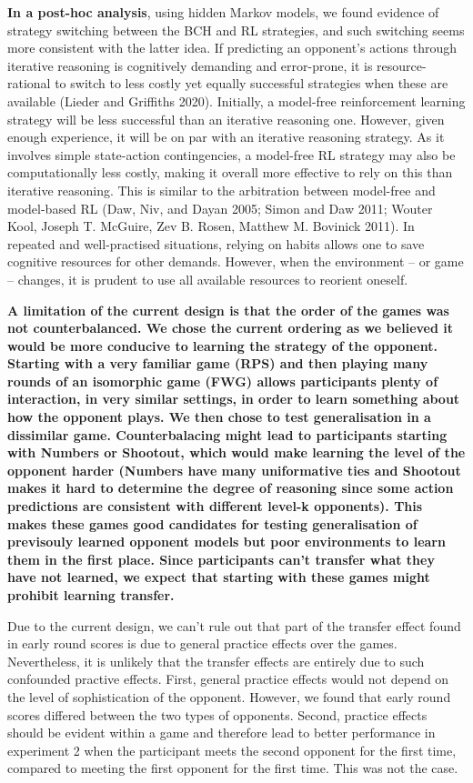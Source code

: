 \documentclass[smallextended]{svjour3}       %
\begin{document}
\textbf{In a post-hoc analysis}, using hidden Markov models, we found
evidence of strategy switching between the BCH and RL strategies, and
such switching seems more consistent with the latter idea. If predicting
an opponent's actions through iterative reasoning is cognitively
demanding and error-prone, it is resource-rational to switch to less
costly yet equally successful strategies when these are available
(Lieder and Griffiths 2020). Initially, a model-free reinforcement
learning strategy will be less successful than an iterative reasoning
one. However, given enough experience, it will be on par with an
iterative reasoning strategy. As it involves simple state-action
contingencies, a model-free RL strategy may also be computationally less
costly, making it overall more effective to rely on this than iterative
reasoning. This is similar to the arbitration between model-free and
model-based RL (Daw, Niv, and Dayan 2005; Simon and Daw 2011; Wouter
Kool, Joseph T. McGuire, Zev B. Rosen, Matthew M. Bovinick 2011). In
repeated and well-practised situations, relying on habits allows one to
save cognitive resources for other demands. However, when the
environment -- or game -- changes, it is prudent to use all available
resources to reorient oneself.

\textbf{A limitation of the current design is that the order of the
games was not counterbalanced. We chose the current ordering as we
believed it would be more conducive to learning the strategy of the
opponent. Starting with a very familiar game (RPS) and then playing many
rounds of an isomorphic game (FWG) allows participants plenty of
interaction, in very similar settings, in order to learn something about
how the opponent plays. We then chose to test generalisation in a
dissimilar game. Counterbalacing might lead to participants starting
with Numbers or Shootout, which would make learning the level of the
opponent harder (Numbers have many uniformative ties and Shootout makes
it hard to determine the degree of reasoning since some action
predictions are consistent with different level-k opponents). This makes
these games good candidates for testing generalisation of previsouly
learned opponent models but poor environments to learn them in the first
place. Since participants can't transfer what they have not learned, we
expect that starting with these games might prohibit learning transfer.}

Due to the current design, we can't rule out that part of the transfer
effect found in early round scores is due to general practice effects
over the games. Nevertheless, it is unlikely that the transfer effects
are entirely due to such confounded practive effects. First, general
practice effects would not depend on the level of sophistication of the
opponent. However, we found that early round scores differed between the
two types of opponents. Second, practice effects should be evident
within a game and therefore lead to better performance in experiment 2
when the participant meets the second opponent for the first time,
compared to meeting the first opponent for the first time. This was not
the case.
\end{document}
